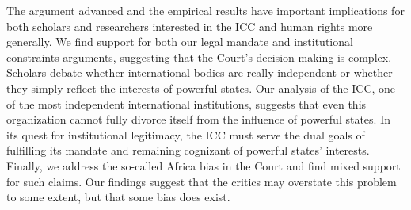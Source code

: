 The argument advanced and the empirical results have important implications for both scholars and researchers interested in the ICC and human rights more generally. We find support for both our legal mandate and institutional constraints arguments, suggesting that the Court's decision-making is complex. Scholars debate whether international bodies are really independent or whether they simply reflect the interests of powerful states. Our analysis of the ICC, one of the most independent international institutions, suggests that even this organization cannot fully divorce itself from the influence of powerful states. In its quest for institutional legitimacy, the ICC must serve the dual goals of fulfilling its mandate and remaining cognizant of powerful states' interests. Finally, we address the so-called Africa bias in the Court and find mixed support for such claims. Our findings suggest that the critics may overstate this problem to some extent, but that some bias does exist.